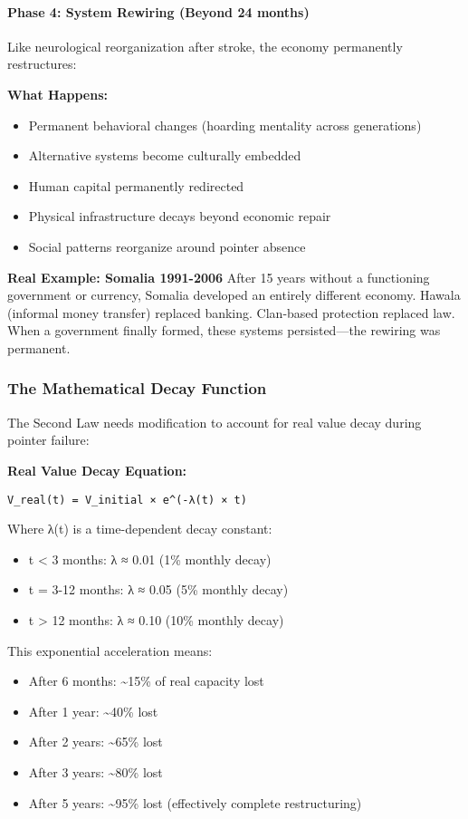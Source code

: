 \documentclass[11pt,oneside]{book}
\begin{document}
\paragraph{Phase 4: System Rewiring (Beyond 24 months)}
Like neurological reorganization after stroke, the economy permanently restructures:

\textbf{What Happens:}
\begin{itemize}
\item Permanent behavioral changes (hoarding mentality across generations)
\item Alternative systems become culturally embedded
\item Human capital permanently redirected
\item Physical infrastructure decays beyond economic repair
\item Social patterns reorganize around pointer absence
\end{itemize}

\textbf{Real Example: Somalia 1991-2006}
After 15 years without a functioning government or currency, Somalia developed an entirely different economy. Hawala (informal money transfer) replaced banking. Clan-based protection replaced law. When a government finally formed, these systems persisted—the rewiring was permanent.

\subsubsection{The Mathematical Decay Function}

The Second Law needs modification to account for real value decay during pointer failure:

\textbf{Real Value Decay Equation:}
\begin{verbatim}
V_real(t) = V_initial × e^(-λ(t) × t)
\end{verbatim}

Where λ(t) is a time-dependent decay constant:
\begin{itemize}
\item t < 3 months: λ ≈ 0.01 (1\% monthly decay)
\item t = 3-12 months: λ ≈ 0.05 (5\% monthly decay)
\item t > 12 months: λ ≈ 0.10 (10\% monthly decay)
\end{itemize}

This exponential acceleration means:
\begin{itemize}
\item After 6 months: \textasciitilde{}15\% of real capacity lost
\item After 1 year: \textasciitilde{}40\% lost
\item After 2 years: \textasciitilde{}65\% lost
\item After 3 years: \textasciitilde{}80\% lost
\item After 5 years: \textasciitilde{}95\% lost (effectively complete restructuring)
\end{itemize}
\end{document}

